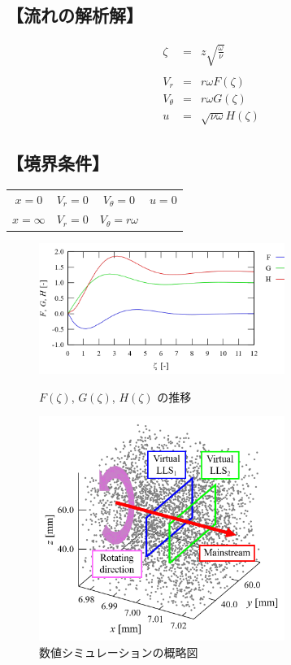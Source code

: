 \documentclass[twocolumn,a4j]{jsarticle}
\begin{document}
\subsection*{【流れの解析解】}
\begin{eqnarray*}
  \zeta &=& z \sqrt{\frac{\omega}{\nu}}\\
  \\
  V_r &=& r \omega F \left(\zeta\right)\\
  V_\theta &=& r \omega G \left(\zeta\right)\\
  u &=& \sqrt{\nu \omega} H \left(\zeta\right)
\end{eqnarray*}

\subsection*{【境界条件】}
\begin{table}[hbtp]
  \centering
  \begin{tabular}{ c c c c }
    $x=0$      & $V_r=0$ & $V_\theta =0$        & $u=0$ \\
    $x=\infty$ & $V_r=0$ & $V_\theta =r \omega$ &       \\
  \end{tabular}
\end{table}

\newpage

\begin{figure}[htbp]
  \footnotesize
  \begin{center}
    \includegraphics[width=80mm]{../images/FGH.png}
    \caption{$F(\zeta)$, $G(\zeta)$, $H(\zeta)$ の推移}
    \includegraphics[width=80mm]{../images/Numerical_simulation_of_flow.png}
    \caption{数値シミュレーションの概略図}
  \end{center}
\end{figure}
\end{document}
